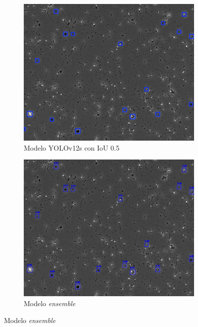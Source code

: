 \documentclass[12pt,a4paper,onecolumn,oneside]{report}
\begin{document}
\begin{figure}[H]
  \vspace{0.3cm} 
  
  \begin{subfigure}[b]{0.48\textwidth}
    \centering
    \includegraphics[width=\textwidth]{figuras/evaluacion_cualitativa/38/38_v12.jpg}
    \caption{Modelo YOLOv12s con IoU 0.5}
    \label{fig:yolov12s_IoU0.5_image_38}
  \end{subfigure}
  \hfill
  \begin{subfigure}[b]{0.48\textwidth}
    \centering
    \includegraphics[width=\textwidth]{figuras/evaluacion_cualitativa/38/38_ensemble.jpg}
    \caption{Modelo \textit{ensemble}}
    \label{fig:ensemble_image_38}
  \end{subfigure}


\end{figure}
\end{document}
